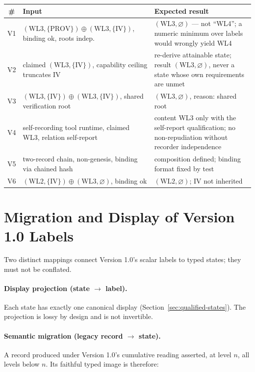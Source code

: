 \documentclass[11pt]{article}
\begin{document}
\begin{center}
\small
\begin{tabularx}{\textwidth}{@{}clY@{}}
\toprule
\# & Input & Expected result \\
\midrule
V1 & $(\mathrm{WL3},\{\mathrm{PROV}\}) \oplus (\mathrm{WL3},\{\mathrm{IV}\})$, binding ok, roots indep. & $(\mathrm{WL3}, \varnothing)$ --- not ``WL4''; a numeric minimum over labels would wrongly yield WL4 \\
V2 & claimed $(\mathrm{WL3},\{\mathrm{IV}\})$, capability ceiling truncates IV & re-derive attainable state; result $(\mathrm{WL3},\varnothing)$, never a state whose own requirements are unmet \\
V3 & $(\mathrm{WL3},\{\mathrm{IV}\}) \oplus (\mathrm{WL3},\{\mathrm{IV}\})$, shared verification root & $(\mathrm{WL3}, \varnothing)$, reason: shared root \\
V4 & self-recording tool runtime, claimed WL3, relation self-report & content WL3 only with the self-report qualification; no non-repudiation without recorder independence \\
V5 & two-record chain, non-genesis, binding via chained hash & composition defined; binding format fixed by test \\
V6 & $(\mathrm{WL2},\{\mathrm{IV}\}) \oplus (\mathrm{WL3},\varnothing)$, binding ok & $(\mathrm{WL2}, \varnothing)$; IV not inherited \\
\bottomrule
\end{tabularx}
\end{center}

\section{Migration and Display of Version 1.0 Labels}
\label{sec:migration}

Two distinct mappings connect Version 1.0's scalar labels to typed states; they must not be conflated.

\paragraph{Display projection (state $\to$ label).} Each state has exactly one canonical display (Section~\ref{sec:qualified-states}). The projection is lossy by design and is not invertible.

\paragraph{Semantic migration (legacy record $\to$ state).} A record produced under Version 1.0's cumulative reading asserted, at level $n$, all levels below $n$. Its faithful typed image is therefore:
\end{document}
